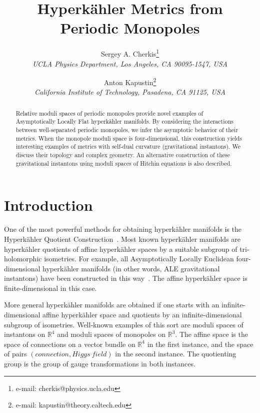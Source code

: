 \documentclass[a4paper,12pt, amsfonts, amssymb]{article}
\title{\bf Hyperk\"ahler Metrics from\\ Periodic Monopoles}
\author{
Sergey A. Cherkis\thanks{e-mail: cherkis@physics.ucla.edu}\\
\it UCLA Physics Department, Los Angeles, CA 90095-1547, USA
 \rm
\and
Anton Kapustin\thanks{e-mail: kapustin@theory.caltech.edu}\\
\it California Institute of Technology, Pasadena, CA 91125, USA
}
\newcommand{\RR}{{\mathbb R}}
\begin{document}
\begin{titlepage}

\renewcommand{\thepage}{ }
\date{}

\maketitle

\begin{abstract}
Relative moduli spaces of periodic monopoles provide novel examples of Asymptotically Locally Flat hyperk\"ahler manifolds. By considering the interactions between well-separated periodic monopoles, we infer the
asymptotic behavior of their metrics. When the monopole moduli space is
four-dimensional, this construction yields interesting examples of metrics
with self-dual curvature (gravitational instantons).
We discuss their topology and complex geometry.
An alternative construction of these gravitational instantons using moduli spaces of Hitchin equations is also described.


\end{abstract}
\vspace{-5.5in}

\parbox{\linewidth}
{\small\hfill {}}

\end{titlepage}
\pagestyle{headings}

\section{Introduction}

One of the most powerful methods for obtaining hyperk\"ahler manifolds is the
Hyperk\"ahler Quotient Construction~\cite{HKLR}. Most known hyperk\"ahler
manifolds are hyperk\"ahler quotients of affine hyperk\"ahler spaces by a suitable subgroup of tri-holomorphic isometries. For example, all Asymptotically Locally Euclidean four-dimensional hyperk\"ahler manifolds (in other words, ALE gravitational instantons) have been constructed in this way~\cite{Kr}. The affine hyperk\"ahler space is finite-dimensional in
this case.

More general hyperk\"ahler manifolds are obtained if one starts with an
infinite-dimensional affine hyperk\"ahler space and quotients by an
infinite-dimensional subgroup of isometries. Well-known examples
of this sort are moduli spaces of instantons on $\RR^4$
and moduli spaces of monopoles on $\RR^3$. The affine space is the space
of connections on a vector bundle on $\RR^4$ in the first instance, and the space of pairs $(connection,Higgs\ field)$ in the second instance. The quotienting group is the group of gauge transformations in both instances.
\end{document}
